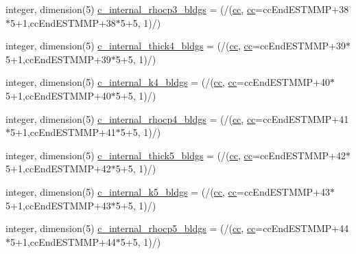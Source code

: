\begin{DoxyCompactItemize}
\item 
integer, dimension(5) \hyperlink{namespaceallocatearray_acb2bd7717c5f5c616bed1e3e845d7622}{c\+\_\+internal\+\_\+rhocp3\+\_\+bldgs} = (/(\hyperlink{namespaceallocatearray_ac863c81704eb507dee10f5e10741e10c}{cc}, \hyperlink{namespaceallocatearray_ac863c81704eb507dee10f5e10741e10c}{cc}=cc\+End\+E\+S\+T\+M\+MP+38$\ast$5+1,cc\+End\+E\+S\+T\+M\+MP+38$\ast$5+5, 1)/)
\item 
integer, dimension(5) \hyperlink{namespaceallocatearray_a896a292ac04d4a5d5bf5622279d45b16}{c\+\_\+internal\+\_\+thick4\+\_\+bldgs} = (/(\hyperlink{namespaceallocatearray_ac863c81704eb507dee10f5e10741e10c}{cc}, \hyperlink{namespaceallocatearray_ac863c81704eb507dee10f5e10741e10c}{cc}=cc\+End\+E\+S\+T\+M\+MP+39$\ast$5+1,cc\+End\+E\+S\+T\+M\+MP+39$\ast$5+5, 1)/)
\item 
integer, dimension(5) \hyperlink{namespaceallocatearray_ab282d65ad07ad23a979bed1bb5e4e688}{c\+\_\+internal\+\_\+k4\+\_\+bldgs} = (/(\hyperlink{namespaceallocatearray_ac863c81704eb507dee10f5e10741e10c}{cc}, \hyperlink{namespaceallocatearray_ac863c81704eb507dee10f5e10741e10c}{cc}=cc\+End\+E\+S\+T\+M\+MP+40$\ast$5+1,cc\+End\+E\+S\+T\+M\+MP+40$\ast$5+5, 1)/)
\item 
integer, dimension(5) \hyperlink{namespaceallocatearray_a089e481a4c0e27082406ebae70f79099}{c\+\_\+internal\+\_\+rhocp4\+\_\+bldgs} = (/(\hyperlink{namespaceallocatearray_ac863c81704eb507dee10f5e10741e10c}{cc}, \hyperlink{namespaceallocatearray_ac863c81704eb507dee10f5e10741e10c}{cc}=cc\+End\+E\+S\+T\+M\+MP+41$\ast$5+1,cc\+End\+E\+S\+T\+M\+MP+41$\ast$5+5, 1)/)
\item 
integer, dimension(5) \hyperlink{namespaceallocatearray_af4fbd7daacbc3f20dc51eae71cce01af}{c\+\_\+internal\+\_\+thick5\+\_\+bldgs} = (/(\hyperlink{namespaceallocatearray_ac863c81704eb507dee10f5e10741e10c}{cc}, \hyperlink{namespaceallocatearray_ac863c81704eb507dee10f5e10741e10c}{cc}=cc\+End\+E\+S\+T\+M\+MP+42$\ast$5+1,cc\+End\+E\+S\+T\+M\+MP+42$\ast$5+5, 1)/)
\item 
integer, dimension(5) \hyperlink{namespaceallocatearray_a929dafc0dac03e78c84c0a23d926aea8}{c\+\_\+internal\+\_\+k5\+\_\+bldgs} = (/(\hyperlink{namespaceallocatearray_ac863c81704eb507dee10f5e10741e10c}{cc}, \hyperlink{namespaceallocatearray_ac863c81704eb507dee10f5e10741e10c}{cc}=cc\+End\+E\+S\+T\+M\+MP+43$\ast$5+1,cc\+End\+E\+S\+T\+M\+MP+43$\ast$5+5, 1)/)
\item 
integer, dimension(5) \hyperlink{namespaceallocatearray_a910f0bcc144af81c13e0a44c1ed408fb}{c\+\_\+internal\+\_\+rhocp5\+\_\+bldgs} = (/(\hyperlink{namespaceallocatearray_ac863c81704eb507dee10f5e10741e10c}{cc}, \hyperlink{namespaceallocatearray_ac863c81704eb507dee10f5e10741e10c}{cc}=cc\+End\+E\+S\+T\+M\+MP+44$\ast$5+1,cc\+End\+E\+S\+T\+M\+MP+44$\ast$5+5, 1)/)

\end{DoxyCompactItemize}
